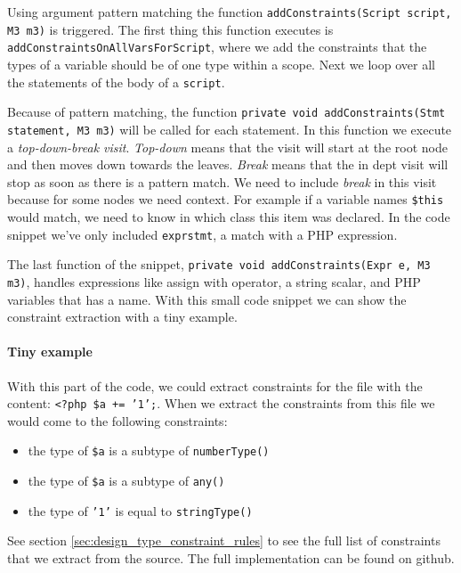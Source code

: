 \documentclass[../main.tex]{subfiles}
\begin{document}
	Using argument pattern matching the function \texttt{addConstraints(Script script, M3 m3)} is triggered.
	The first thing this function executes is \texttt{addConstraintsOnAllVarsForScript}, where we add the constraints that the types of a variable should be of one type within a scope.
	Next we loop over all the statements of the body of a \texttt{script}.
	
	Because of pattern matching, the function \texttt{private void addConstraints(Stmt statement, M3 m3)} will be called for each statement.
	In this function we execute a \textit{top-down-break visit}. \textit{Top-down} means that the visit will start at the root node and then moves down towards the leaves.
	\textit{Break} means that the in dept visit will stop as soon as there is a pattern match.
	We need to include \textit{break} in this visit because for some nodes we need context.
	For example if a variable names \texttt{\$this} would match, we need to know in which class this item was declared.
	In the code snippet we've only included \texttt{exprstmt}, a match with a PHP expression.
	
	The last function of the snippet, \texttt{private void addConstraints(Expr e, M3 m3)}, handles expressions like assign with operator, a string scalar, and PHP variables that has a name.
	With this small code snippet we can show the constraint extraction with a tiny example.
	
	\paragraph{Tiny example}
	With this part of the code, we could extract constraints for the file with the content: \texttt{<?php \$a += '1';}.
	When we extract the constraints from this file we would come to the following constraints:
	\begin{itemize}
		\item the type of \texttt{\$a} is a subtype of \texttt{numberType()}
		\item the type of \texttt{\$a} is a subtype of \texttt{any()}
		\item the type of \texttt{'1'} is equal to \texttt{stringType()}
	\end{itemize}
	See section \ref{sec:design_type_constraint_rules} to see the full list of constraints that we extract from the source.
	The full implementation can be found on github.
	
\end{document}
